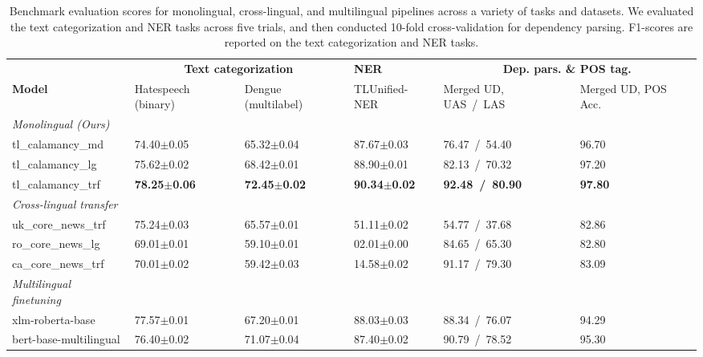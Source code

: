 \documentclass[../report.tex]{subfiles}
\begin{document}
\begin{table*}[t]
\begin{tabular}{@{}p{4cm}p{2cm}p{2cm}p{2cm}p{2cm}p{2cm}@{}}
\toprule
                           & \multicolumn{2}{c}{\textbf{Text categorization}} & \textbf{NER} & \multicolumn{2}{c}{\textbf{Dep. pars. \& POS tag.}}                         \\
\textbf{Model}             & Hatespeech (binary) & Dengue (multilabel) & TLUnified-NER & Merged UD, UAS~/~LAS & Merged UD, POS Acc. \\ \midrule
\textit{Monolingual (Ours)}              \\
tl\_calamancy\_md          & 74.40$\pm$0.05 & 65.32$\pm$0.04 & 87.67$\pm$0.03 & 76.47~/~54.40 & 96.70\\
tl\_calamancy\_lg          & 75.62$\pm$0.02 & 68.42$\pm$0.01 & 88.90$\pm$0.01 & 82.13~/~70.32 & 97.20\\
tl\_calamancy\_trf         & \textbf{78.25$\pm$0.06} & \textbf{72.45$\pm$0.02} & \textbf{90.34$\pm$0.02} & \textbf{92.48~/~80.90} & \textbf{97.80} \\ \midrule
\textit{Cross-lingual transfer} \\
uk\_core\_news\_trf        & 75.24$\pm$0.03 & 65.57$\pm$0.01 & 51.11$\pm$0.02 & 54.77~/~37.68 & 82.86 \\
ro\_core\_news\_lg         & 69.01$\pm$0.01 & 59.10$\pm$0.01 & 02.01$\pm$0.00 & 84.65~/~65.30 & 82.80 \\
ca\_core\_news\_trf        & 70.01$\pm$0.02 & 59.42$\pm$0.03 & 14.58$\pm$0.02 & 91.17~/~79.30 & 83.09 \\ \midrule
\textit{Multilingual finetuning} \\
xlm-roberta-base          & 77.57$\pm$0.01 & 67.20$\pm$0.01 & 88.03$\pm$0.03 & 88.34~/~76.07 & 94.29 \\
bert-base-multilingual    & 76.40$\pm$0.02 & 71.07$\pm$0.04 & 87.40$\pm$0.02 & 90.79~/~78.52 & 95.30 \\
\bottomrule
\end{tabular}
\caption{
    Benchmark evaluation scores for monolingual, cross-lingual, and multilingual pipelines across a variety of tasks and datasets.
    We evaluated the text categorization and NER tasks across five trials, and then conducted 10-fold cross-validation for dependency parsing.
    F1-scores are reported on the text categorization and NER tasks.
}
\label{table:results}
\end{table*}
\end{document}
